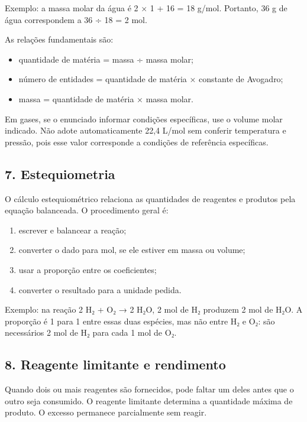 \documentclass[11pt,a4paper]{article}
\begin{document}
Exemplo: a massa molar da água é 2 × 1 + 16 = 18 g/mol. Portanto, 36 g de água correspondem a 36 ÷ 18 = 2 mol.

As relações fundamentais são:

\begin{itemize}
  \item quantidade de matéria = massa ÷ massa molar;
  \item número de entidades = quantidade de matéria × constante de Avogadro;
  \item massa = quantidade de matéria × massa molar.
\end{itemize}

Em gases, se o enunciado informar condições específicas, use o volume molar indicado. Não adote automaticamente 22,4 L/mol sem conferir temperatura e pressão, pois esse valor corresponde a condições de referência específicas.

\subsection*{7. Estequiometria}

O cálculo estequiométrico relaciona as quantidades de reagentes e produtos pela equação balanceada. O procedimento geral é:

\begin{enumerate}
  \item escrever e balancear a reação;
  \item converter o dado para mol, se ele estiver em massa ou volume;
  \item usar a proporção entre os coeficientes;
  \item converter o resultado para a unidade pedida.
\end{enumerate}

Exemplo: na reação 2 H₂ + O₂ → 2 H₂O, 2 mol de H₂ produzem 2 mol de H₂O. A proporção é 1 para 1 entre essas duas espécies, mas não entre H₂ e O₂: são necessários 2 mol de H₂ para cada 1 mol de O₂.

\subsection*{8. Reagente limitante e rendimento}

Quando dois ou mais reagentes são fornecidos, pode faltar um deles antes que o outro seja consumido. O reagente limitante determina a quantidade máxima de produto. O excesso permanece parcialmente sem reagir.
\end{document}
